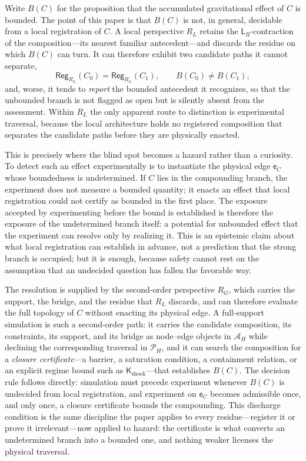 \documentclass[10pt,twoside,a5paper]{article}
\newcommand{\Pspace}{\ensuremath{\mathcal P_H}}
\newcommand{\ARspace}{\ensuremath{\mathcal A_H}}
\newcommand{\Reg}{\ensuremath{\mathsf{Reg}}}
\newcommand{\Edge}{\ensuremath{\mathsf e}}
\newcommand{\Constraint}{\ensuremath{\mathsf K}}
\theoremstyle{definition}
\begin{document}
Write $B(C)$ for the proposition that the accumulated gravitational effect of $C$
is bounded. The point of this paper is that $B(C)$ is not, in general, decidable
from a local registration of $C$. A local perspective $R_L$ retains the
$\mathsf{L}_R$-contraction of the composition---its nearest familiar antecedent---and
discards the residue on which $B(C)$ can turn. It can therefore exhibit two
candidate paths it cannot separate,
\begin{equation}
\Reg_{R_L}(C_0)=\Reg_{R_L}(C_1),
\qquad
B(C_0)\ne B(C_1),
\label{eq:local-blindspot}
\end{equation}
and, worse, it tends to \emph{report} the bounded antecedent it recognizes, so that
the unbounded branch is not flagged as open but is silently absent from the
assessment. Within $R_L$ the only apparent route to distinction is experimental
traversal, because the local architecture holds no registered composition that
separates the candidate paths before they are physically enacted.

This is precisely where the blind spot becomes a hazard rather than a curiosity. To
detect such an effect experimentally is to instantiate the physical edge $\Edge_C$
whose boundedness is undetermined. If $C$ lies in the compounding branch, the
experiment does not measure a bounded quantity; it enacts an effect that local
registration could not certify as bounded in the first place. The exposure accepted
by experimenting before the bound is established is therefore the exposure of the
undetermined branch itself: a potential for unbounded effect that the experiment can
resolve only by realizing it. This is an epistemic claim about what local
registration can establish in advance, not a prediction that the strong branch is
occupied; but it is enough, because safety cannot rest on the assumption that an
undecided question has fallen the favorable way.

The resolution is supplied by the second-order perspective $R_G$, which carries the
support, the bridge, and the residue that $R_L$ discards, and can therefore evaluate
the full topology of $C$ without enacting its physical edge. A full-support
simulation is such a second-order path: it carries the candidate composition, its
constraints, its support, and its bridge as node--edge objects in $\ARspace$ while
declining the corresponding traversal in $\Pspace$, and it can search the composition
for a \emph{closure certificate}---a barrier, a saturation condition, a containment
relation, or an explicit regime bound such as $\Constraint_{\mathrm{shock}}$---that
establishes $B(C)$. The decision rule follows directly: simulation must precede
experiment whenever $B(C)$ is undecided from local registration, and experiment on
$\Edge_C$ becomes admissible once, and only once, a closure certificate bounds the
compounding. This discharge condition is the same discipline the paper applies to
every residue---register it or prove it irrelevant---now applied to hazard: the
certificate is what converts an undetermined branch into a bounded one, and nothing
weaker licenses the physical traversal.
\end{document}
